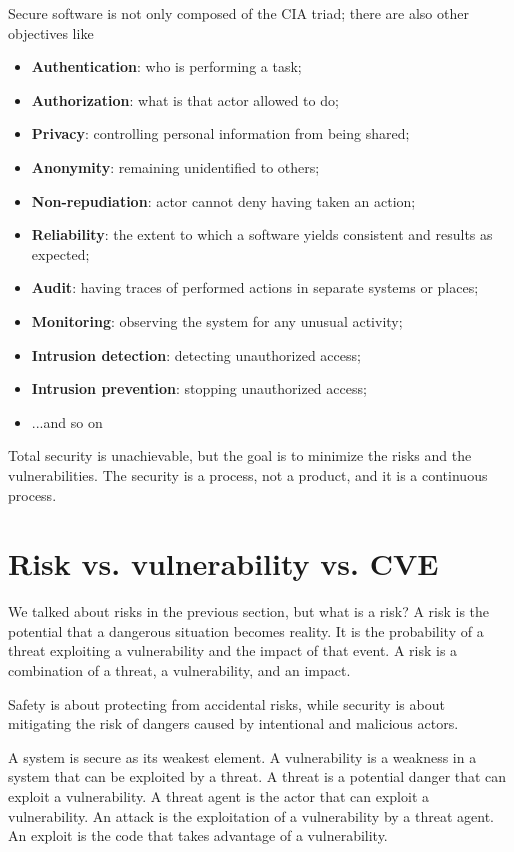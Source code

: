 Secure software is not only composed of the CIA triad; there are also other objectives like~\cite{st-slides}
\begin{itemize}
  \item \textbf{Authentication}: who is performing a task;
  \item \textbf{Authorization}: what is that actor allowed to do;
  \item \textbf{Privacy}: controlling personal information from being shared;
  \item \textbf{Anonymity}: remaining unidentified to others;
  \item \textbf{Non-repudiation}: actor cannot deny having taken an action;
  \item \textbf{Reliability}: the extent to which a software yields consistent and results as expected;
  \item \textbf{Audit}: having traces of performed actions in separate systems or places;
  \item \textbf{Monitoring}: observing the system for any unusual activity;
  \item \textbf{Intrusion detection}: detecting unauthorized access;
  \item \textbf{Intrusion prevention}: stopping unauthorized access;
  \item ...and so on
\end{itemize}

Total security is unachievable, but the goal is to minimize the risks and the vulnerabilities. The security is a process, not a product, and it is a continuous process.~\cite{st-slides}

\section{Risk vs. vulnerability vs. CVE}

We talked about risks in the previous section, but what is a risk? A risk is the potential that a dangerous situation becomes reality. It is the probability of a threat exploiting a vulnerability and the impact of that event. A risk is a combination of a threat, a vulnerability, and an impact.

Safety is about protecting from accidental risks, while security is about mitigating the risk of dangers caused by intentional and malicious actors.

A system is secure as its weakest element. A vulnerability is a weakness in a system that can be exploited by a threat. A threat is a potential danger that can exploit a vulnerability. A threat agent is the actor that can exploit a vulnerability. An attack is the exploitation of a vulnerability by a threat agent. An exploit is the code that takes advantage of a vulnerability.

